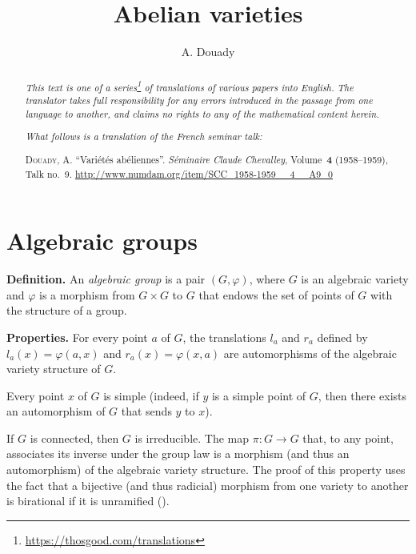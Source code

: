 \documentclass{article}
\title{Abelian varieties}
\author{A. Douady}
\date{}
\newcommand{\doctype}{French seminar talk}
\newcommand{\origcit}{%
  \textsc{Douady, A.}
  ``Vari\'{e}t\'{e}s ab\'{e}liennes''.
  \emph{S\'{e}minaire Claude Chevalley}, Volume~\textbf{4} (1958--1959), Talk no.~9.
  {\url{http://www.numdam.org/item/SCC_1958-1959__4__A9_0}}%
}
\newenvironment{rmenv}[1]
  {\phantomsection\par\medskip\noindent\textbf{#1.}\rmfamily}
  {\medskip}
\newcommand{\oldpage}[1]{\marginpar{\footnotesize$\Big\vert$ \textit{p.~#1}}}
\begin{document}
\maketitle
\thispagestyle{fancy}

\renewcommand{\abstractname}{Translator's note.}

\begin{abstract}
  \renewcommand*{\thefootnote}{\fnsymbol{footnote}}
  \emph{This text is one of a series\footnote{\url{https://thosgood.com/translations}} of translations of various papers into English.}
  \emph{The translator takes full responsibility for any errors introduced in the passage from one language to another, and claims no rights to any of the mathematical content herein.}

  \medskip
  
  \emph{What follows is a translation of the \doctype:}

  \medskip\noindent
  \origcit
\end{abstract}

\setcounter{footnote}{0}

\tableofcontents
\bigskip



\section{Algebraic groups}
\label{1}

\oldpage{9-01}
\begin{rmenv}{Definition}
  An \emph{algebraic group} is a pair $(G,\varphi)$, where $G$ is an algebraic variety and $\varphi$ is a morphism from $G\times G$ to $G$ that endows the set of points of $G$ with the structure of a group.
\end{rmenv}

\begin{rmenv}{Properties}
  For every point $a$ of $G$, the translations $l_a$ and $r_a$ defined by $l_a(x)=\varphi(a,x)$ and $r_a(x)=\varphi(x,a)$ are automorphisms of the algebraic variety structure of $G$.

  Every point $x$ of $G$ is simple (indeed, if $y$ is a simple point of $G$, then there exists an automorphism of $G$ that sends $y$ to $x$).

  If $G$ is connected, then $G$ is irreducible.
  The map $\pi\colon G\to G$ that, to any point, associates its inverse under the group law is a morphism (and thus an automorphism) of the algebraic variety structure.
  The proof of this property uses the fact that a bijective (and thus radicial) morphism from one variety to another is birational if it is unramified (\cite[p.~211, Corollary~2 to Proposition~3, Section~II, Chapter~VI]{1}).
\end{rmenv}
\end{document}
